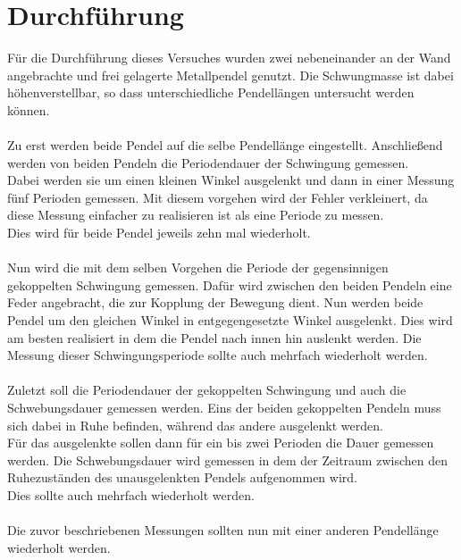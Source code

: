 \newpage
\section{Durchführung}
Für die Durchführung dieses Versuches wurden zwei nebeneinander an der Wand angebrachte und frei gelagerte Metallpendel genutzt. 
Die Schwungmasse ist dabei höhenverstellbar, so dass unterschiedliche Pendellängen untersucht werden können.\\\\
Zu erst werden beide Pendel auf die selbe Pendellänge eingestellt. Anschließend werden von beiden Pendeln die Periodendauer der Schwingung gemessen.\\
Dabei werden sie um einen kleinen Winkel ausgelenkt und dann in einer Messung fünf Perioden gemessen. 
Mit diesem vorgehen wird der Fehler verkleinert, da diese Messung einfacher zu realisieren ist als eine Periode zu messen.\\
Dies wird für beide Pendel jeweils zehn mal wiederholt.\\\\
Nun wird die mit dem selben Vorgehen die Periode der gegensinnigen gekoppelten Schwingung gemessen. 
Dafür wird zwischen den beiden Pendeln eine Feder angebracht, die zur Kopplung der Bewegung dient.
Nun werden beide Pendel um den gleichen Winkel in entgegengesetzte Winkel ausgelenkt. Dies wird am besten realisiert in dem die Pendel nach innen hin auslenkt werden. 
Die Messung dieser Schwingungsperiode sollte auch mehrfach wiederholt werden.\\\\
Zuletzt soll die Periodendauer der gekoppelten Schwingung und auch die Schwebungsdauer gemessen werden. 
Eins der beiden gekoppelten Pendeln muss sich dabei in Ruhe befinden, während das andere ausgelenkt werden. \\
Für das ausgelenkte sollen dann für ein bis zwei Perioden die Dauer gemessen werden.
Die Schwebungsdauer wird gemessen in dem der Zeitraum zwischen den Ruhezuständen des unausgelenkten Pendels aufgenommen wird.\\
Dies sollte auch mehrfach wiederholt werden.\\\\

\noindent
Die zuvor beschriebenen Messungen sollten nun mit einer anderen Pendellänge wiederholt werden.




